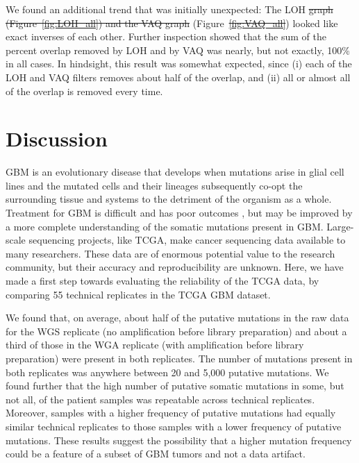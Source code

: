 \documentclass[11 pt]{article} %
\providecommand{\DIFadd}[1]{{\protect\color{blue}\uwave{#1}}} %
\providecommand{\DIFdel}[1]{{\protect\color{red}\sout{#1}}}                      %
\providecommand{\DIFaddbegin}{} %
\providecommand{\DIFaddend}{} %
\providecommand{\DIFdelbegin}{} %
\providecommand{\DIFdelend}{} %
\begin{document}
We found an additional trend that was initially unexpected: The LOH \DIFdelbegin \DIFdel{graph (Figure~\ref{fig:LOH_all}) and the VAQ graph }\DIFdelend \DIFaddbegin \DIFadd{and VAQ graphs }\DIFaddend (Figure~\DIFdelbegin \DIFdel{\ref{fig:VAQ_all}}\DIFdelend \DIFaddbegin \DIFadd{\ref{fig:LOH-VAQ_all}}\DIFaddend ) looked like exact inverses of each other. Further inspection showed that the sum of the percent overlap removed by LOH and by VAQ was nearly, but not exactly, 100\% in all cases. In hindsight, this result was somewhat expected, since (i) each of the LOH and VAQ filters removes about half of the overlap, and (ii) all or almost all of the overlap is removed every time.

\section*{Discussion}

GBM is an evolutionary disease that develops when mutations arise in glial cell lines and the mutated cells and their lineages subsequently co-opt the surrounding tissue and systems to the detriment of the organism as a whole. Treatment for GBM is difficult and has poor outcomes \citep{GBM-stats}, but may be improved by a more complete understanding of the somatic mutations present in GBM. Large-scale sequencing projects, like TCGA, make cancer sequencing data available to many researchers. These data are of enormous potential value to the research community, but their accuracy and reproducibility are unknown. Here, we have made a first step towards evaluating the reliability of the TCGA data, by comparing 55 technical replicates in the TCGA GBM dataset.

We found that, on average, about half of the putative mutations in the raw data for the WGS replicate (no amplification before library preparation) and about a third of those in the WGA replicate (with amplification before library preparation) were present in both replicates. The number of mutations present in both replicates was anywhere between 20 and 5,000 putative mutations. We found further that the high number of putative somatic mutations in some, but not all, of the patient samples was repeatable across technical replicates. Moreover, samples with a higher frequency of putative mutations had equally similar technical replicates to those samples with a lower frequency of putative mutations. These results suggest the possibility that a higher mutation frequency could be a feature of a subset of GBM tumors and not a data artifact.
\end{document}
